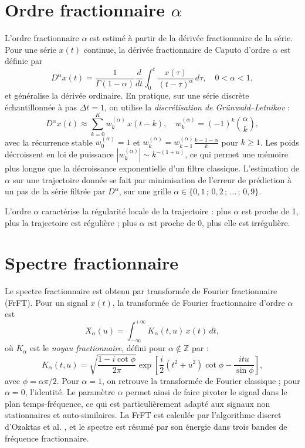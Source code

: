 \section{Ordre fractionnaire $\alpha$}
\label{sec:ordre_frac}
L'ordre fractionnaire $\alpha$ est estimé à partir de la dérivée fractionnaire de la série. Pour une série $x(t)$ continue, la dérivée fractionnaire de Caputo d'ordre $\alpha$ est définie par
\begin{equation}
D^\alpha x(t) = \frac{1}{\Gamma(1-\alpha)} \frac{d}{dt} \int_0^t \frac{x(\tau)}{(t-\tau)^\alpha} \, d\tau, \quad 0 < \alpha < 1,
\end{equation}
et généralise la dérivée ordinaire. En pratique, sur une série discrète échantillonnée à pas $\Delta t = 1$, on utilise la \emph{discrétisation de Grünwald--Letnikov} \cite{podlubny1999} :
\begin{equation}
D^\alpha x(t) \approx \sum_{k=0}^{K} w_k^{(\alpha)} \, x(t-k), \quad w_k^{(\alpha)} = (-1)^k \binom{\alpha}{k},
\label{eq:gl}
\end{equation}
avec la récurrence stable $w_0^{(\alpha)} = 1$ et $w_k^{(\alpha)} = w_{k-1}^{(\alpha)} \frac{k-1-\alpha}{k}$ pour $k \ge 1$. Les poids décroissent en loi de puissance $|w_k^{(\alpha)}| \sim k^{-(1+\alpha)}$, ce qui permet une mémoire plus longue que la décroissance exponentielle d'un filtre classique. L'estimation de $\alpha$ sur une trajectoire donnée se fait par minimisation de l'erreur de prédiction à un pas de la série filtrée par $D^\alpha$, sur une grille $\alpha \in \{0{,}1\,;\,0{,}2\,;\,\dots\,;\,0{,}9\}$.

L'ordre $\alpha$ caractérise la régularité locale de la trajectoire : plus $\alpha$ est proche de 1, plus la trajectoire est régulière ; plus $\alpha$ est proche de 0, plus elle est irrégulière.

\section{Spectre fractionnaire}
\label{sec:spectre_frac}
Le spectre fractionnaire est obtenu par transformée de Fourier fractionnaire (FrFT). Pour un signal $x(t)$, la transformée de Fourier fractionnaire d'ordre $\alpha$ est
\begin{equation}
X_\alpha(u) = \int_{-\infty}^{+\infty} K_\alpha(t, u) \, x(t) \, dt,
\end{equation}
où $K_\alpha$ est le \emph{noyau fractionnaire}, défini pour $\alpha \notin \mathbb{Z}$ par \cite{ozaktas2001} :
\begin{equation}
K_\alpha(t, u) = \sqrt{\frac{1 - i\cot\phi}{2\pi}} \exp\left[\frac{i}{2}(t^2 + u^2)\cot\phi - \frac{itu}{\sin\phi}\right],
\end{equation}
avec $\phi = \alpha\pi/2$. Pour $\alpha = 1$, on retrouve la transformée de Fourier classique ; pour $\alpha = 0$, l'identité. Le paramètre $\alpha$ permet ainsi de faire pivoter le signal dans le plan temps-fréquence, ce qui est particulièrement adapté aux signaux non stationnaires et auto-similaires. La FrFT est calculée par l'algorithme discret d'Ozaktas et al. \cite{ozaktas2001}, et le spectre est résumé par son énergie dans trois bandes de fréquence fractionnaire.

